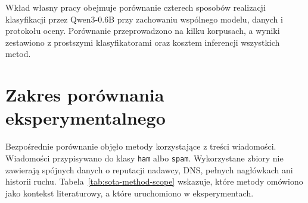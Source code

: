 Wkład własny pracy obejmuje porównanie czterech sposobów realizacji
klasyfikacji przez Qwen3-0.6B przy zachowaniu wspólnego modelu, danych i
protokołu oceny. Porównanie przeprowadzono na kilku korpusach, a wyniki
zestawiono z prostszymi klasyfikatorami oraz kosztem inferencji wszystkich
metod.

\section{Zakres porównania eksperymentalnego}

Bezpośrednie porównanie objęło metody korzystające z treści wiadomości.
Wiadomości przypisywano do klasy \texttt{ham} albo \texttt{spam}. Wykorzystane
zbiory nie zawierają spójnych danych o reputacji nadawcy, DNS, pełnych
nagłówkach ani historii ruchu.
Tabela~\ref{tab:sota-method-scope} wskazuje, które metody omówiono jako kontekst
literaturowy, a które uruchomiono w eksperymentach.

\begin{table}[H]
\centering
\small
\resizebox{\textwidth}{!}{}
\caption{Zakres metod omawianych w przeglądzie oraz ich wykorzystanie w części
eksperymentalnej.}
\label{tab:sota-method-scope}
\end{table}
